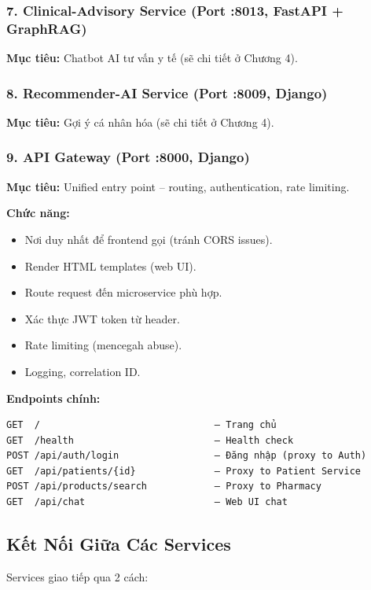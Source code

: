 \documentclass[12pt,a4paper]{article}
\begin{document}
\subsubsection{7. Clinical-Advisory Service (Port :8013, FastAPI + GraphRAG)}

\textbf{Mục tiêu:} Chatbot AI tư vấn y tế (sẽ chi tiết ở Chương 4).

\subsubsection{8. Recommender-AI Service (Port :8009, Django)}

\textbf{Mục tiêu:} Gợi ý cá nhân hóa (sẽ chi tiết ở Chương 4).

\subsubsection{9. API Gateway (Port :8000, Django)}

\textbf{Mục tiêu:} Unified entry point – routing, authentication, rate limiting.

\textbf{Chức năng:}
\begin{itemize}
    \item Nơi duy nhất để frontend gọi (tránh CORS issues).
    \item Render HTML templates (web UI).
    \item Route request đến microservice phù hợp.
    \item Xác thực JWT token từ header.
    \item Rate limiting (mencegah abuse).
    \item Logging, correlation ID.
\end{itemize}

\textbf{Endpoints chính:}
\begin{verbatim}
GET  /                               – Trang chủ
GET  /health                         – Health check
POST /api/auth/login                 – Đăng nhập (proxy to Auth)
GET  /api/patients/{id}              – Proxy to Patient Service
POST /api/products/search            – Proxy to Pharmacy
GET  /api/chat                       – Web UI chat
\end{verbatim}

\subsection{Kết Nối Giữa Các Services}

Services giao tiếp qua 2 cách:
\end{document}
